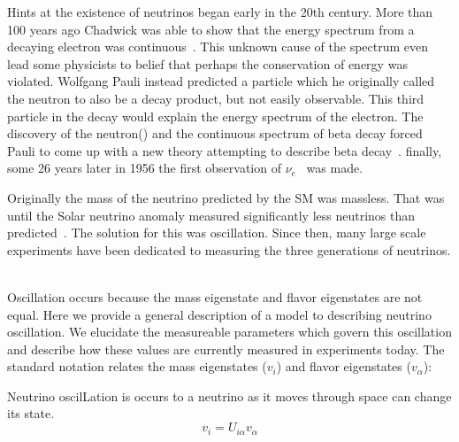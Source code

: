 Hints at the existence of neutrinos began early in the 20th century.
More than 100 years ago Chadwick was able to show that the energy spectrum from a decaying electron was continuous~\citep{Chadwick:1914zz}.
This unknown cause of the spectrum even lead some physicists to belief that perhaps the conservation of energy was violated.
Wolfgang Pauli instead predicted a particle which he originally called the neutron to also be a decay product, but not easily observable.
This third particle in the decay would explain the energy spectrum of the electron.
The discovery of the neutron(\citep{Chadwick1932PossibleEO}) and the continuous spectrum of beta decay forced Pauli to come up with a new theory attempting to describe beta decay~\citep{pauli_1934}.
finally, some 26 years later in 1956 the first observation of $\nu_{e}$~\citep{first_neutrino_measurement} was made.

Originally the mass of the neutrino predicted by the SM was massless.
That was until the Solar neutrino anomaly measured significantly less neutrinos than predicted~\citep{solar_neutrino_problem_PhysRevLett.20.1205}.
The solution for this was oscillation.
Since then, many large scale experiments have been dedicated to measuring the three generations of neutrinos.
~\citep{SNO_2002_neutrino_PhysRevLett.89.011301,
neutrino_measurement_NOvA_2019_prl,
t2k_2011_neutrino_PhysRevLett.107.041801,
reno_2012_neutrino_PhysRevLett.108.191802,
FUKUDA2002_solar_neutrino_oscillation,
kamland_2003_neutrino_PhysRevLett.90.021802,
daya_bay_2012_neutrino_PhysRevLett.108.171803,
PhysRevD.91.072010_t2k_2015,
doubleChooz_2012_neutrino_PhysRevLett.108.131801}

Oscillation occurs because the mass eigenstate and flavor eigenstates are not equal.
Here we provide a general description of a model to describing neutrino oscillation.
We elucidate the measureable parameters which govern this oscillation and describe how these values are currently measured in experiments today.
The standard notation relates the mass eigenstates ($v_{i}$) and flavor eigenstates ($v_{\alpha}$):

Neutrino oscilLation is occurs to a neutrino as it moves through space can change its state.
\begin{equation}
  v_{i} = U_{i\alpha}v_{\alpha}
\end{equation}~\label{eq:relate_eigenstates}


